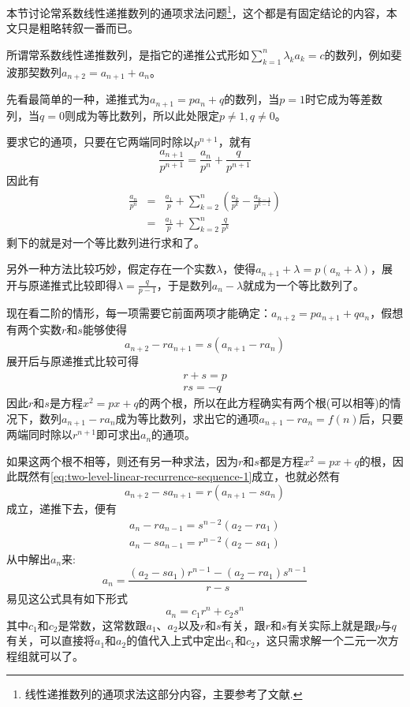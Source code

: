 本节讨论常系数线性递推数列的通项求法问题\footnote{线性递推数列的通项求法这部分内容，主要参考了文献\cite{olympic-math}.}，这个都是有固定结论的内容，本文只是粗略转叙一番而已。

所谓常系数线性递推数列，是指它的递推公式形如$\sum_{k=1}^n \lambda _k a_k = c$的数列，例如斐波那契数列$a_{n+2}=a_{n+1}+a_n$。

先看最简单的一种，递推式为$a_{n+1}=pa_n+q$的数列，当$p=1$时它成为等差数列，当$q=0$则成为等比数列，所以此处限定$p \neq 1, q \neq 0$。

要求它的通项，只要在它两端同时除以$p^{n+1}$，就有
\[ \frac{a_{n+1}}{p^{n+1}} = \frac{a_n}{p^n} + \frac{q}{p^{n+1}} \]
因此有
\begin{eqnarray*}
\frac{a_n}{p^n} & = & \frac{a_1}{p} + \sum_{k=2}^{n}\left( \frac{a_k}{p^k} - \frac{a_{k-1}}{p^{k-1}} \right) \\
& = & \frac{a_1}{p} + \sum_{k=2}^{n}\frac{q}{p^k}
\end{eqnarray*}
剩下的就是对一个等比数列进行求和了。

另外一种方法比较巧妙，假定存在一个实数$\lambda$，使得$a_{n+1}+\lambda=p(a_n+\lambda)$，展开与原递推式比较即得$\lambda=\frac{q}{p-1}$，于是数列$a_n-\lambda$就成为一个等比数列了。

现在看二阶的情形，每一项需要它前面两项才能确定：$a_{n+2}=pa_{n+1}+qa_n$，假想有两个实数$r$和$s$能够使得
\begin{equation}
  \label{eq:two-level-linear-recurrence-sequence-1}
a_{n+2}-ra_{n+1}=s(a_{n+1}-ra_n)
\end{equation}
展开后与原递推式比较可得
\begin{align*}
  r+s  =  p \\
  rs  =  -q
\end{align*}
因此$r$和$s$是方程$x^2=px+q$的两个根，所以在此方程确实有两个根(可以相等)的情况下，数列$a_{n+1}-ra_{n}$成为等比数列，求出它的通项$a_{n+1}-ra_n=f(n)$后，只要两端同时除以$r^{n+1}$即可求出$a_n$的通项。

如果这两个根不相等，则还有另一种求法，因为$r$和$s$都是方程$x^2=px+q$的根，因此既然有\ref{eq:two-level-linear-recurrence-sequence-1}成立，也就必然有
\begin{equation}
  \label{eq:two-level-linear-recurrence-sequence-2}
a_{n+2}-sa_{n+1}=r(a_{n+1}-sa_n)
\end{equation}
成立，递推下去，便有
\begin{align*}
  a_{n}-ra_{n-1}  =  s^{n-2}(a_2-ra_1) \\
  a_{n}-sa_{n-1}  =  r^{n-2}(a_2-sa_1) 
\end{align*}
从中解出$a_n$来:
\[ a_n=\frac{(a_2-sa_1)r^{n-1}-(a_2-ra_1)s^{n-1}}{r-s} \]
易见这公式具有如下形式
\[ a_n=c_1r^n+c_2s^n \]
其中$c_1$和$c_2$是常数，这常数跟$a_1$、$a_2$以及$r$和$s$有关，跟$r$和$s$有关实际上就是跟$p$与$q$有关，可以直接将$a_1$和$a_2$的值代入上式中定出$c_1$和$c_2$，这只需求解一个二元一次方程组就可以了。

